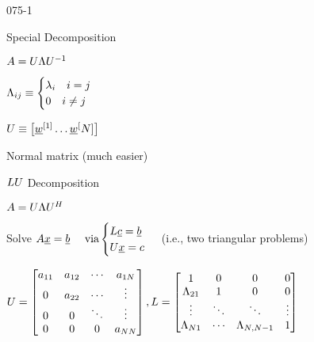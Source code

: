 \begin{mitframe}{075-1}
\begin{listone}
	\item Special Decomposition
    	\begin{listtwo}
        	\item $\helmholtz=\uvel\debroglie\uvel^{-1}$
            	\begin{listthree}
                	\item $\debroglie_{\state{j}}\equiv\begin{cases}\wavel_{\state}\quad\state=j\\ 0\quad\state\neq{j}\end{cases}$
                	\item $\uvel\equiv\big[\vort^{[1]}\ldots\vort^[\nummoles]\big]$
                \end{listthree}
        	\item Normal matrix (much easier)
              \end{listtwo}
 \item $\length\uvel$      Decomposition     
            \begin{listtwo}
            	\item $\helmholtz=\uvel\debroglie\uvel^{\enthalpy}$
                \item Solve $\helmholtz\uline{\disp}=\uline{b}\quad \text{  via}\begin{cases}\length\uline{\lightspeed}=\uline{b}\\  \uvel\uline{\disp}=\lightspeed\end{cases} $ (i.e., two triangular problems)
                \item $\uvel=\begin{bmatrix}\activity_{11}&\activity_{12}&\cdots&\activity_{1\nummoles} \\ 0&\activity_{22}&\cdots&\vdots \\
                {0} & {0} &\ddots & \vdots \\ {0} & {0}& {0}&  \activity_{\nummoles\nummoles}\end{bmatrix} , \length=\begin{bmatrix}1 & 0 & 0 &0\\ \debroglie_{21}& 1 & 0 & 0 \\ \vdots &\ddots &\ddots &\vdots \\ \debroglie_{\nummoles{1}} &\cdots &\debroglie_{\nummoles,\nummoles-1} & 1 \end{bmatrix}$					\begin{listthree}

\end{listthree}
\end{listtwo}
\end{listone}
\end{mitframe}
